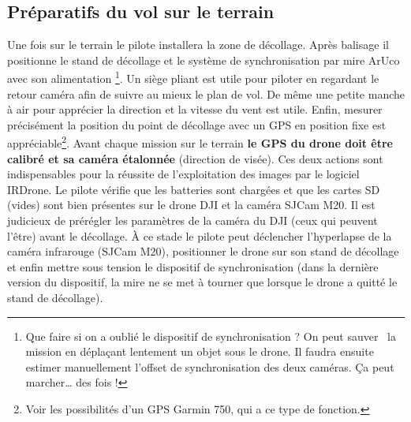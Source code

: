 \documentclass[a4paper,11pt]{report}
\begin{document}
\subsection{Préparatifs du vol sur le terrain}
Une fois sur le terrain le pilote installera la zone de décollage. Après balisage il positionne le stand de décollage et le système de synchronisation par mire ArUco avec son alimentation
\footnote{Que faire si on a oublié le dispositif de synchronisation ? On peut \og sauver \fg~la mission en déplaçant lentement un objet sous le drone. Il faudra ensuite estimer manuellement l'offset de synchronisation des deux caméras. Ça peut marcher\dots{} des fois !}. 
Un siège pliant est utile pour piloter en regardant le retour caméra afin de suivre au mieux le plan de vol. 
De même une petite manche à air pour apprécier la direction et la vitesse du vent est utile. 
Enfin, mesurer précisément la position du point de décollage avec un GPS en position fixe est appréciable\footnote{Voir les possibilités d'un GPS Garmin 750, qui a ce type de fonction.}. 
Avant chaque mission sur le terrain \textbf{le GPS du drone doit être calibré et sa caméra étalonnée} (direction de visée). 
Ces deux actions sont indispensables pour la réussite de l'exploitation des images par le logiciel IRDrone. 
Le pilote vérifie que les batteries sont chargées et que les cartes SD (vides) sont bien présentes sur le drone DJI et la caméra SJCam M20. 
Il est judicieux de prérégler les paramètres de la caméra du DJI (ceux qui peuvent l'être) avant le décollage. 
À ce stade le pilote peut déclencher l'hyperlapse de la caméra infrarouge (SJCam M20), positionner le drone sur son stand de décollage et enfin mettre sous tension le dispositif de synchronisation (dans la dernière version du dispositif, la mire ne se met à tourner que lorsque le drone a quitté le stand de décollage).
\end{document}
